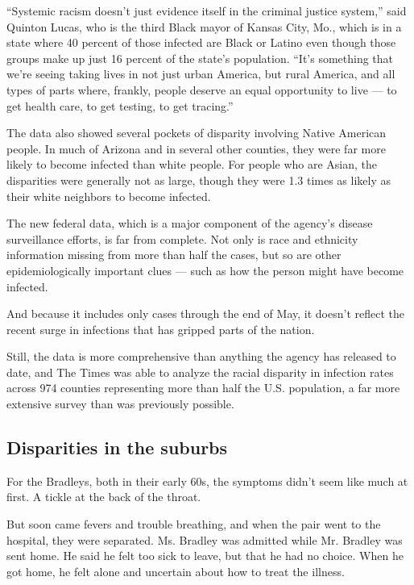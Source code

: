 ``Systemic racism doesn't just evidence itself in the criminal justice
system,'' said Quinton Lucas, who is the third Black mayor of Kansas
City, Mo., which is in a state where 40 percent of those infected are
Black or Latino even though those groups make up just 16 percent of the
state's population. ``It's something that we're seeing taking lives in
not just urban America, but rural America, and all types of parts where,
frankly, people deserve an equal opportunity to live --- to get health
care, to get testing, to get tracing.''

The data also showed several pockets of disparity involving Native
American people. In much of Arizona and in several other counties, they
were far more likely to become infected than white people. For people
who are Asian, the disparities were generally not as large, though they
were 1.3 times as likely as their white neighbors to become infected.

The new federal data, which is a major component of the agency's disease
surveillance efforts, is far from complete. Not only is race and
ethnicity information missing from more than half the cases, but so are
other epidemiologically important clues --- such as how the person might
have become infected.

And because it includes only cases through the end of May, it doesn't
reflect the recent surge in infections that has gripped parts of the
nation.

Still, the data is more comprehensive than anything the agency has
released to date, and The Times was able to analyze the racial disparity
in infection rates across 974 counties representing more than half the
U.S. population, a far more extensive survey than was previously
possible.

\hypertarget{disparities-in-the-suburbs}{%
\subsection{Disparities in the
suburbs}\label{disparities-in-the-suburbs}}

For the Bradleys, both in their early 60s, the symptoms didn't seem like
much at first. A tickle at the back of the throat.

But soon came fevers and trouble breathing, and when the pair went to
the hospital, they were separated. Ms. Bradley was admitted while Mr.
Bradley was sent home. He said he felt too sick to leave, but that he
had no choice. When he got home, he felt alone and uncertain about how
to treat the illness.

